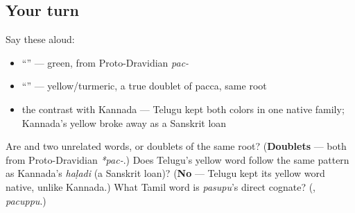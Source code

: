 \subsection*{Your turn}
Say these aloud:

\begin{itemize}
\raggedright
  \item \textquotedblleft{}\textquotedblright{} — green, from Proto-Dravidian \emph{pac-}
  \item \textquotedblleft{}\textquotedblright{} — yellow/turmeric, a true doublet of pacca, same root
  \item the contrast with Kannada — Telugu kept both colors in one native family; Kannada's yellow broke away as a Sanskrit loan
\end{itemize}

\begin{tcolorbox}[breakable,colback=teal!4,colframe=teal!35!black,title={Before you move on}]
Are \textbf{} and \textbf{} two unrelated words, or doublets of the same root? (\textbf{Doublets} — both from Proto-Dravidian \emph{*pac-}.) Does Telugu's yellow word follow the same pattern as Kannada's \emph{haḷadi} (a Sanskrit loan)? (\textbf{No} — Telugu kept its yellow word native, unlike Kannada.) What Tamil word is \emph{pasupu}'s direct cognate? (\textbf{}, \emph{pacuppu}.)
\end{tcolorbox}
